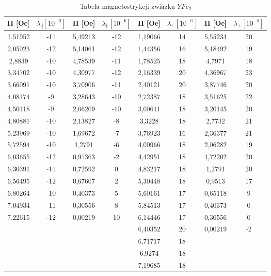 \documentclass[a4paper,12pt]{article}
\numberwithin{equation}{section}
\begin{document}
\begin{appendices}


  \label{YMagnetoTab}
  \scriptsize
  \begin{longtable}[c]{|c|c|c|c|c|c|c|c|}
\caption{Tabela magnetostrykcji związku $YFe_2$}\\
\hline
H [Oe]	&	$\lambda_{||} [10^{-6}]	$ 	&	H [Oe]	&	$\lambda_{||}  [10^{-6}]	$	&	H [Oe]	&	$\lambda_{\perp}  [10^{-6}]$		&	H [Oe]	&	$\lambda_{\perp} [10^{-6}]$	\\\hline\hline
1,51952	&	-11	&	5,49213	&	-12	&	1,19066	&	14	&	5,55234	&	20	\\\hline
2,05023	&	-12	&	5,14061	&	-12	&	1,44356	&	16	&	5,18492	&	19	\\\hline
2,8839	&	-10	&	4,78539	&	-11	&	1,78525	&	18	&	4,7971	&	18	\\\hline
3,34702	&	-10	&	4,30977	&	-12	&	2,16339	&	20	&	4,36967	&	23	\\\hline
3,66091	&	-10	&	3,70906	&	-11	&	2,40121	&	20	&	3,87746	&	20	\\\hline
4,08174	&	-9	&	3,28643	&	-10	&	2,72387	&	18	&	3,51625	&	22	\\\hline
4,50118	&	-9	&	2,66209	&	-10	&	3,00641	&	18	&	3,20145	&	20	\\\hline
4,80881	&	-10	&	2,13827	&	-8	&	3,3228	&	18	&	2,7732	&	21	\\\hline
5,23969	&	-10	&	1,69672	&	-7	&	3,76923	&	16	&	2,36377	&	21	\\\hline
5,72594	&	-10	&	1,2791	&	-6	&	4,00966	&	18	&	2,06282	&	19	\\\hline
6,03655	&	-12	&	0,91363	&	-2	&	4,42951	&	18	&	1,72202	&	20	\\\hline
6,30391	&	-11	&	0,72592	&	0	&	4,83217	&	18	&	1,2791	&	20	\\\hline
6,56495	&	-12	&	0,67607	&	2	&	5,30448	&	18	&	0,9513	&	17	\\\hline
6,80264	&	-10	&	0,40373	&	5	&	5,60161	&	17	&	0,65118	&	9	\\\hline
7,04934	&	-11	&	0,30556	&	8	&	5,84513	&	17	&	0,40373	&	0	\\\hline
7,22615	&	-12	&	0,00219	&	10	&	6,14446	&	17	&	0,30556	&	0	\\\hline
	\multicolumn{4}{|c|}{}	&	6,40352	&	20	&	0,00219	&	-2	\\\cline{5-8}
	\multicolumn{4}{|c|}{}	&	6,71717	&	18	&	\multicolumn{2}{c|}{}	\\\cline{5-6}
	\multicolumn{4}{|c|}{}	&	6,9274	&	18	&	\multicolumn{2}{c|}{}	\\\cline{5-6}
	\multicolumn{4}{|c|}{}	&	7,19685	&	18	&	\multicolumn{2}{c|}{}	\\\hline
\end{longtable}



\end{appendices}
\end{document}
